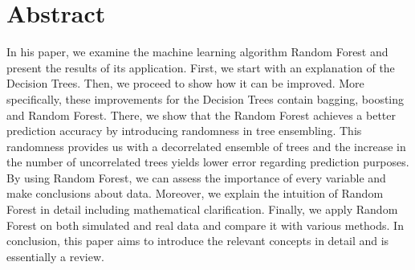 \section*{Abstract}
\thispagestyle{empty}
In his paper, we examine the machine learning algorithm Random Forest
and present the results of its application.
First, we start with an explanation of the Decision Trees.
Then, we proceed to show how it can be improved.
More specifically, these improvements for the Decision Trees contain bagging, boosting and Random Forest.
There, we show that the Random Forest achieves a better prediction accuracy
by introducing randomness in tree ensembling.
This randomness provides us with a decorrelated ensemble of trees and
the increase in the number of uncorrelated trees yields lower error regarding prediction purposes. By using Random Forest, we can assess the importance of every variable
and make conclusions about data.
Moreover, we explain the intuition of Random Forest in detail including mathematical clarification.
Finally, we apply Random Forest on both simulated and real data and compare it with various methods.
In conclusion, this paper aims to introduce the relevant concepts in detail and is essentially a review. 




